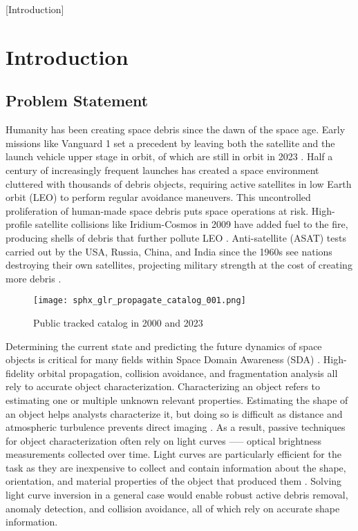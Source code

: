 [Introduction]
\graphicspath{{/Users/liamrobinson/Documents/PyLightCurves/docs/build/html/_images}}

\chapter{Introduction}

\section{Problem Statement}

Humanity has been creating space debris since the dawn of the space age. Early missions like Vanguard 1 set a precedent by leaving both the satellite and the launch vehicle upper stage in orbit, of which are still in orbit in 2023 \cite{vanguard1}. Half a century of increasingly frequent launches has created a space environment cluttered with thousands of debris objects, requiring active satellites in low Earth orbit (LEO) to perform regular avoidance maneuvers. This uncontrolled proliferation of human-made space debris puts space operations at risk. High-profile satellite collisions like Iridium-Cosmos in 2009 have added fuel to the fire, producing shells of debris that further pollute LEO \cite{vallado4ed}. Anti-satellite (ASAT) tests carried out by the USA, Russia, China, and India since the 1960s see nations destroying their own satellites, projecting military strength at the cost of creating more debris \cite{vallado4ed}.

\begin{figure}[ht]
    \centering
    \texttt{[image: sphx\_glr\_propagate\_catalog\_001.png]}
    \caption{Public tracked catalog in 2000 and 2023}
    \label{fig:catalog_comparison}
\end{figure}

Determining the current state and predicting the future dynamics of space objects is critical for many fields within Space Domain Awareness (SDA) \cite{frueh2019notes}. High-fidelity orbital propagation, collision avoidance, and fragmentation analysis all rely to accurate object characterization. Characterizing an object refers to estimating one or multiple unknown relevant properties. Estimating the shape of an object helps analysts characterize it, but doing so is difficult as distance and atmospheric turbulence prevents direct imaging \cite{fan2020thesis}. As a result, passive techniques for object characterization often rely on light curves --— optical brightness measurements collected over time. Light curves are particularly efficient for the task as they are inexpensive to collect and contain information about the shape, orientation, and material properties of the object that produced them \cite{fan2020thesis, burton2021mapping}. Solving light curve inversion in a general case would enable robust active debris removal, anomaly detection, and collision avoidance, all of which rely on accurate shape information.


